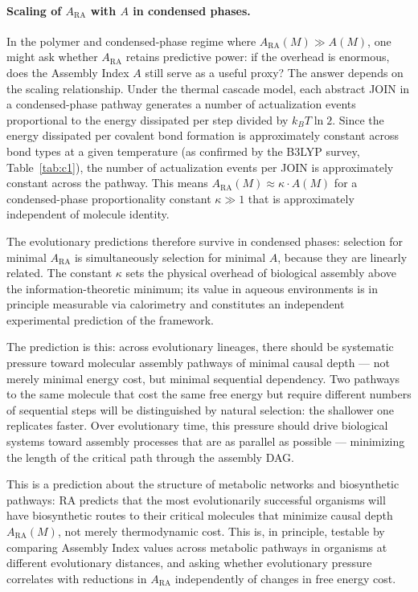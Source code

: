 \documentclass[11pt,a4paper]{article}
\theoremstyle{plain}
\theoremstyle{definition}
\theoremstyle{remark}
\newcommand{\ARA}{A_{\mathrm{RA}}}
\begin{document}
\paragraph{Scaling of $\ARA$ with $A$ in condensed phases.}
In the polymer and condensed-phase regime where $\ARA(M) \gg A(M)$, one might ask
whether $\ARA$ retains predictive power: if the overhead is enormous, does the
Assembly Index $A$ still serve as a useful proxy? The answer depends on the scaling
relationship. Under the thermal cascade model, each abstract JOIN in a condensed-phase
pathway generates a number of actualization events proportional to the energy
dissipated per step divided by $k_BT\ln 2$. Since the energy dissipated per
covalent bond formation is approximately constant across bond types at a given
temperature (as confirmed by the B3LYP survey, Table~\ref{tab:c1}), the number of
actualization events per JOIN is approximately constant across the pathway. This
means $\ARA(M) \approx \kappa \cdot A(M)$ for a condensed-phase proportionality
constant $\kappa \gg 1$ that is approximately independent of molecule identity.

The evolutionary predictions therefore survive in condensed phases: selection for
minimal $\ARA$ is simultaneously selection for minimal $A$, because they are
linearly related. The constant $\kappa$ sets the physical overhead of biological
assembly above the information-theoretic minimum; its value in aqueous environments
is in principle measurable via calorimetry and constitutes an independent
experimental prediction of the framework.

The prediction is this: across evolutionary lineages, there should be systematic
pressure toward molecular assembly pathways of minimal causal depth --- not merely
minimal energy cost, but minimal sequential dependency. Two pathways to the same
molecule that cost the same free energy but require different numbers of sequential
steps will be distinguished by natural selection: the shallower one replicates
faster. Over evolutionary time, this pressure should drive biological systems
toward assembly processes that are as parallel as possible --- minimizing the
length of the critical path through the assembly DAG.

This is a prediction about the structure of metabolic networks and biosynthetic
pathways: RA predicts that the most evolutionarily successful organisms will
have biosynthetic routes to their critical molecules that minimize causal depth
$\ARA(M)$, not merely thermodynamic cost. This is, in principle, testable by
comparing Assembly Index values across metabolic pathways in organisms at different
evolutionary distances, and asking whether evolutionary pressure correlates with
reductions in $\ARA$ independently of changes in free energy cost.
\end{document}

